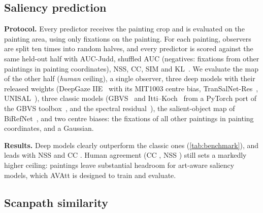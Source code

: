 \documentclass[10pt,twocolumn,letterpaper]{article}
\newcommand{\avatt}{AVAtt}
\newcommand{\mypara}[1]{\vspace{2pt}\noindent\textbf{#1}\hspace{0.5em}}
\begin{document}
\subsection{Saliency prediction}
\label{sec:saliency}

\mypara{Protocol.} Every predictor receives the painting crop and is evaluated on the painting area, using only
fixations on the painting. For each painting, observers are split ten times into random halves, and every predictor is
scored against the same held-out half with AUC-Judd, shuffled AUC (negatives: fixations from other paintings in
painting coordinates), NSS, CC, SIM and KL~\cite{bylinskii2019metrics}. We evaluate the map of the other half
(\emph{human} ceiling), a single observer, three deep models with their released weights
(DeepGaze IIE~\cite{linardos2021deepgaze} with its MIT1003 centre bias, TranSalNet-Res~\cite{lou2022transalnet},
UNISAL~\cite{droste2020unisal}), three classic models (GBVS~\cite{harel2006gbvs} and Itti--Koch~\cite{itti1998model}
from a PyTorch port of the GBVS toolbox~\cite{gbvstorch}, and the spectral residual~\cite{hou2007spectral}), the
salient-object map of BiRefNet~\cite{zheng2024birefnet}, and two centre biases: the fixations of all other paintings
in painting coordinates, and a Gaussian.

\mypara{Results.} Deep models clearly outperform the classic ones (\cref{tab:benchmark}), and \bestModel{} leads with
NSS \bestModelNSS{} and CC \bestModelCC. Human agreement (CC \humanCC, NSS \humanNSS) still sets a markedly higher
ceiling: paintings leave substantial headroom for art-aware saliency models, which \avatt{} is designed to train and
evaluate.

\begin{table}[t]
  \centering
  \caption{Saliency benchmark on the paintings (mean over paintings, split-half). Bold: best non-human predictor.}
  \label{tab:benchmark}
\end{table}

\subsection{Scanpath similarity}
\label{sec:scanpath}
\end{document}

